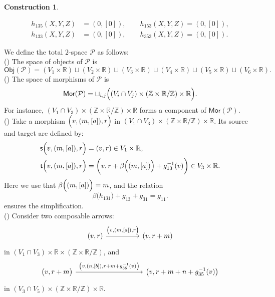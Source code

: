 \documentclass{article}
\theoremstyle{plain}
\theoremstyle{definition}
\newtheorem{const}[thm]{Construction}
\newcommand{\rNum}[1]{\lowercase\expandafter{\romannumeral #1\relax}}
\begin{document}
\begin{const}
\begin{itemize}
\begin{align*}
h_{135}(X,Y,Z) & = \left(0,[0]\right), \qquad h_{153}(X,Y,Z) = \left(0,[0]\right), \\
h_{133}(X,Y,Z) & = \left(0,[0]\right), \qquad h_{353}(X,Y,Z) = \left(0,[0]\right).
\end{align*}
\end{itemize}
We define the total $2$-space $\mathcal{P}$ as follows: \\
(\rNum{1}) The space of objects of $\mathcal{P}$ is
\[
\mathsf{Obj}(\mathcal{P}) = (V_1 \times \mathbb{R}) \sqcup (V_2 \times \mathbb{R}) \sqcup (V_3 \times \mathbb{R}) \sqcup (V_4 \times \mathbb{R}) \sqcup (V_5 \times \mathbb{R}) \sqcup (V_6 \times \mathbb{R}).
\]
(\rNum{2}) The space of morphisms of $\mathcal{P}$ is 
\[
\mathsf{Mor}(\mathcal{P}) = \sqcup_{i,j} \Bigl((V_i \cap V_j) \times (\mathbb{Z} \times \mathbb{R}/\mathbb{Z}) \times \mathbb{R}\Bigr).
\]
For instance, $(V_1 \cap V_3) \times (\mathbb{Z} \times \mathbb{R}/\mathbb{Z}) \times \mathbb{R}$ forms a component of $\mathsf{Mor}(\mathcal{P})$. \\
(\rNum{3}) Take a morphism $\Bigl(v,(m,[a]),r\Bigr)$ in $(V_1 \cap V_3) \times (\mathbb{Z} \times \mathbb{R}/\mathbb{Z}) \times \mathbb{R}$. Its source and target are defined by:
\begin{align*}
\mathsf{s}\Bigl(v,(m,[a]),r\Bigr) & = (v,r) \in V_1 \times \mathbb{R}, \\
\mathsf{t}\Bigl(v,(m,[a]),r\Bigr) & = \biggl(v,r+\beta\Bigl((m,[a])\Bigr)+g_{1 3}^{-1}(v)\biggr) \in V_3 \times \mathbb{R}.
\end{align*}
Here we use that $\beta\Bigl((m,[a])\Bigr) = m$, and the relation
\begin{equation*}
\beta\bigl(h_{1 3 1}\bigl) + g_{1 3} + g_{3 1} = g_{1 1}.
\end{equation*}
ensures the simplification. \\
(\rNum{4}) Consider two composable arrows:
\[
\begin{tikzcd}[row sep=huge,column sep=huge]
(v,r) \arrow[r,"{\big(v,(m,[a]),r\big)}"] & (v,r+m)
\end{tikzcd}
\]
in $(V_1 \cap V_3) \times \mathbb{R} \times (\mathbb{Z} \times \mathbb{R}/\mathbb{Z})$, and
\[
\begin{tikzcd}[row sep=huge,column sep=huge]
\big(v,r+m\big) \arrow[rr,"{\big(v,(n,[b]),r+m+g^{-1}_{35}(v)\big)}"] & & \big(v,r+m+n+g^{-1}_{3 5}(v)\big)
\end{tikzcd}
\]
in $(V_3 \cap V_5) \times (\mathbb{Z} \times \mathbb{R}/\mathbb{Z}) \times \mathbb{R}$.

\end{const}
\end{document}
